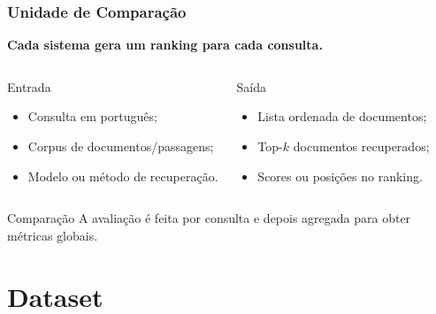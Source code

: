 \documentclass[aspectratio=169]{beamer}
\begin{document}
\begin{frame}
\frametitle{Unidade de Comparação}

\textbf{Cada sistema gera um ranking para cada consulta.}

\vspace{0.3cm}

\begin{columns}

\begin{block}{Entrada}
\begin{itemize}
  \item Consulta em português;
  \item Corpus de documentos/passagens;
  \item Modelo ou método de recuperação.
\end{itemize}
\end{block}

\begin{block}{Saída}
\begin{itemize}
  \item Lista ordenada de documentos;
  \item Top-$k$ documentos recuperados;
  \item Scores ou posições no ranking.
\end{itemize}
\end{block}

\end{columns}

\vspace{0.3cm}

\begin{alertblock}{Comparação}
A avaliação é feita por consulta e depois agregada para obter métricas globais.
\end{alertblock}

\end{frame}

\section{Dataset}
\end{document}
